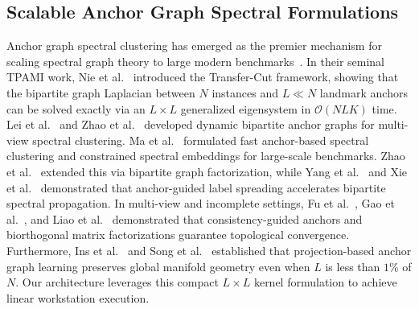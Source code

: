 \documentclass[preprint,12pt]{elsarticle}
\begin{document}
\subsection{Scalable Anchor Graph Spectral Formulations}
Anchor graph spectral clustering has emerged as the premier mechanism for scaling spectral graph theory to large modern benchmarks~\cite{nie2024fast,zhang2025anchor,tkde2026fast}. In their seminal TPAMI work, Nie et al.~\cite{nie2024fast} introduced the Transfer-Cut framework, showing that the bipartite graph Laplacian between $N$ instances and $L \ll N$ landmark anchors can be solved exactly via an $L \times L$ generalized eigensystem in $\mathcal{O}(NLK)$ time. Lei et al.~\cite{lei2024anchor} and Zhao et al.~\cite{zhao2024multiview} developed dynamic bipartite anchor graphs for multi-view spectral clustering. Ma et al.~\cite{ma2025fast,ma2025large} formulated fast anchor-based spectral clustering and constrained spectral embeddings for large-scale benchmarks. Zhao et al.~\cite{zhao2026efficient} extended this via bipartite graph factorization, while Yang et al.~\cite{yang2025anchor} and Xie et al.~\cite{xie2025fast} demonstrated that anchor-guided label spreading accelerates bipartite spectral propagation. In multi-view and incomplete settings, Fu et al.~\cite{fu2025anchor}, Gao et al.~\cite{gao2026consistency}, and Liao et al.~\cite{liao2026multiview} demonstrated that consistency-guided anchors and biorthogonal matrix factorizations guarantee topological convergence. Furthermore, Ins et al.~\cite{ins2025fast} and Song et al.~\cite{song2026enhanced} established that projection-based anchor graph learning preserves global manifold geometry even when $L$ is less than $1\%$ of $N$. Our architecture leverages this compact $L \times L$ kernel formulation to achieve linear workstation execution.
\end{document}
